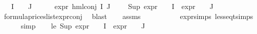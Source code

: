 \begin{isabellebody}
\ \ \ {\isachardoublequoteopen}I\ {\isacharequal}{\kern0pt}\ {\isacharbraceleft}{\kern0pt}{\isacharbraceright}{\kern0pt}\ {\isasymand}\ J\ {\isacharequal}{\kern0pt}\ {\isacharbraceleft}{\kern0pt}{\isacharbraceright}{\kern0pt}{\isachardoublequoteclose}\isanewline
%
\isadelimproof
%
\endisadelimproof
%
\isatagproof
{}\isamarkupfalse%
{\isacharminus}{\kern0pt}\isanewline
\ \ \isamarkupfalse%
\ {\isachardoublequoteopen}expr{\isacharunderscore}{\kern0pt}{}\ {\isacharparenleft}{\kern0pt}hml{\isacharunderscore}{\kern0pt}conj\ I\ J\ {\isasymPhi}{\isacharparenright}{\kern0pt}\ {\isacharequal}{\kern0pt}\ {}\ {\isacharplus}{\kern0pt}\ Sup\ {\isacharparenleft}{\kern0pt}{\isacharparenleft}{\kern0pt}expr{\isacharunderscore}{\kern0pt}{}\ {\isasymcirc}\ {\isasymPhi}{\isacharparenright}{\kern0pt}\ {\isacharbackquote}{\kern0pt}\ I\ {\isasymunion}\ {\isacharparenleft}{\kern0pt}expr{\isacharunderscore}{\kern0pt}{}\ {\isasymcirc}\ {\isasymPhi}{\isacharparenright}{\kern0pt}\ {\isacharbackquote}{\kern0pt}\ J{\isacharparenright}{\kern0pt}{\isachardoublequoteclose}\isanewline
\ \ \ \ \isamarkupfalse%
\ formula{\isacharunderscore}{\kern0pt}prices{\isacharunderscore}{\kern0pt}list{\isachardot}{\kern0pt}expr{\isacharunderscore}{\kern0pt}{}{\isacharunderscore}{\kern0pt}conj\ \isamarkupfalse%
\ blast\isanewline
\ \ \isamarkupfalse%
\ assms\ \isamarkupfalse%
\ {\isachardoublequoteopen}{\isachardot}{\kern0pt}{\isachardot}{\kern0pt}{\isachardot}{\kern0pt}\ {\isasymle}\ {}{\isachardoublequoteclose}\isanewline
\ \ \ \ \isamarkupfalse%
\ expr{\isachardot}{\kern0pt}simps\ less{\isacharunderscore}{\kern0pt}eq{\isacharunderscore}{\kern0pt}t{\isachardot}{\kern0pt}simps\isanewline
\ \ \ \ \isamarkupfalse%
\ simp\isanewline
\ \ \isamarkupfalse%
\ le{\isacharunderscore}{\kern0pt}{}{\isacharcolon}{\kern0pt}\ {\isachardoublequoteopen}Sup\ {\isacharparenleft}{\kern0pt}{\isacharparenleft}{\kern0pt}expr{\isacharunderscore}{\kern0pt}{}\ {\isasymcirc}\ {\isasymPhi}{\isacharparenright}{\kern0pt}\ {\isacharbackquote}{\kern0pt}\ I\ {\isasymunion}\ {\isacharparenleft}{\kern0pt}expr{\isacharunderscore}{\kern0pt}{}\ {\isasymcirc}\ {\isasymPhi}{\isacharparenright}{\kern0pt}\ {\isacharbackquote}{\kern0pt}\ J{\isacharparenright}{\kern0pt}\ {\isasymle}\ {}{\isachardoublequoteclose}\isanewline
\ \ \ \ \isamarkupfalse%

\end{isabellebody}
